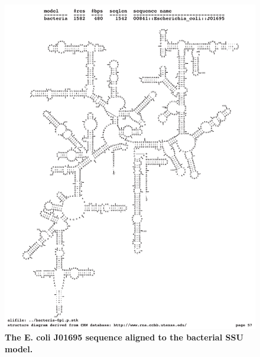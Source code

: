 \begin{figure}
\begin{center}
\includegraphics[width=5.7in]{Figures/ecoli-seq}
\end{center}
\caption{\textbf{The E. coli J01695 sequence aligned to the bacterial
SSU model.}}
\label{fig:ecoli-seq}
\end{figure}

